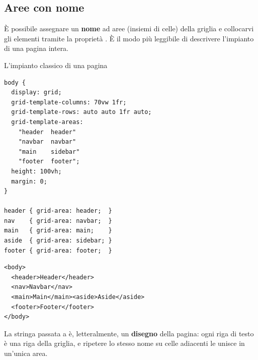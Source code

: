 \subsection{Aree con nome}

È possibile assegnare un \textbf{nome} ad aree (insiemi di celle) della griglia
e collocarvi gli elementi tramite la proprietà . È il modo più
leggibile di descrivere l'impianto di una pagina intera.

\begin{esempio}{L'impianto classico di una pagina}
\begin{affianco}[0.52]
\begin{lstlisting}[style=css, name=areas.css]
body {
  display: grid;
  grid-template-columns: 70vw 1fr;
  grid-template-rows: auto auto 1fr auto;
  grid-template-areas:
    "header  header"
    "navbar  navbar"
    "main    sidebar"
    "footer  footer";
  height: 100vh;
  margin: 0;
}

header { grid-area: header;  }
nav    { grid-area: navbar;  }
main   { grid-area: main;    }
aside  { grid-area: sidebar; }
footer { grid-area: footer;  }
\end{lstlisting}

\begin{lstlisting}[style=html, name=areas.html]
<body>
  <header>Header</header>
  <nav>Navbar</nav>
  <main>Main</main><aside>Aside</aside>
  <footer>Footer</footer>
</body>
\end{lstlisting}

\risultato
\begin{browser}
\end{browser}
\end{affianco}

La stringa passata a  è, letteralmente, un
\textbf{disegno} della pagina: ogni riga di testo è una riga della griglia, e
ripetere lo stesso nome su celle adiacenti le unisce in un'unica area.
\end{esempio}

